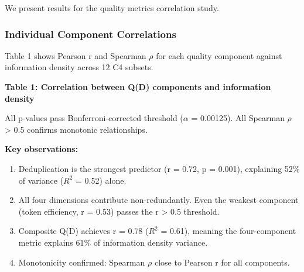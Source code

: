 
We present results for the quality metrics correlation study.

\subsubsection{Individual Component Correlations}

Table 1 shows Pearson r and Spearman $\rho$ for each quality component against information density across 12 C4 subsets.

\textbf{Table 1: Correlation between Q(D) components and information density}

\begin{table}[htbp]
\centering
{}
\end{table}

All p-values pass Bonferroni-corrected threshold ($\alpha$ = 0.00125). All Spearman $\rho$ > 0.5 confirms monotonic relationships.

\textbf{Key observations:}

\begin{enumerate}
\item Deduplication is the strongest predictor (r = 0.72, p = 0.001), explaining 52\% of variance ($R^2$ = 0.52) alone.
\item All four dimensions contribute non-redundantly. Even the weakest component (token efficiency, r = 0.53) passes the r > 0.5 threshold.
\item Composite Q(D) achieves r = 0.78 ($R^2$ = 0.61), meaning the four-component metric explains 61\% of information density variance.
\item Monotonicity confirmed: Spearman $\rho$ close to Pearson r for all components.
\end{enumerate}

